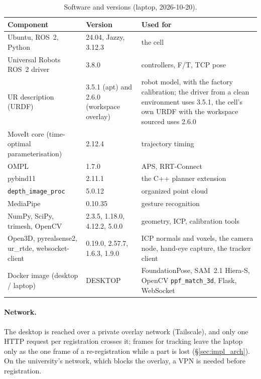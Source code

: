 \begin{table}[htbp]
\caption{Software and versions (laptop, 2026-10-20).}
\label{tab:software}
\centering\small
\begin{tabular}{@{}L{0.36\textwidth}L{0.24\textwidth}L{0.32\textwidth}@{}}
\toprule
Component & Version & Used for \\
\midrule
Ubuntu, ROS~2, Python & 24.04, Jazzy, 3.12.3 & the cell \\
Universal Robots ROS~2 driver & 3.8.0 & controllers, F/T, TCP pose \\
UR description (URDF) & 3.5.1 (apt) and 2.6.0 (workspace overlay) & robot model, with the factory calibration; the driver from a clean environment uses 3.5.1, the cell's own URDF with the workspace sourced uses 2.6.0 \\
MoveIt core (time-optimal parameterisation) & 2.12.4 & trajectory timing \\
OMPL & 1.7.0 & APS, RRT-Connect \\
pybind11 & 2.11.1 & the C++ planner extension \\
\texttt{depth\_image\_proc} & 5.0.12 & organized point cloud \\
MediaPipe & 0.10.35 & gesture recognition \\
NumPy, SciPy, trimesh, OpenCV & 2.3.5, 1.18.0, 4.12.2, 5.0.0 & geometry, ICP, calibration tools \\
Open3D, pyrealsense2, ur\_rtde, websocket-client & 0.19.0, 2.57.7, 1.6.3, 1.9.0 & ICP normals and voxels, the camera node, hand-eye capture, the tracker client \\
Docker image (desktop / laptop) & DESKTOP & FoundationPose, SAM~2.1 Hiera-S, OpenCV \texttt{ppf\_match\_3d}, Flask, WebSocket \\
\bottomrule
\end{tabular}
\end{table}

\paragraph{Network.} The desktop is reached over a private overlay network (Tailscale), and only one
HTTP request per registration crosses it; frames for tracking leave the laptop only as the one frame of
a re-registration while a part is lost (\S\ref{sec:impl_arch}). On the university's network, which blocks the overlay, a VPN is needed
before registration.


